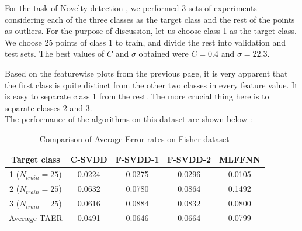 \documentclass{article} %
\begin{document}
For the task of Novelty detection , we performed 3 sets of experiments considering each of the three classes as the target class and the rest of the points as outliers. For the purpose of discussion, let us choose class 1 as the target class. We choose 25 points of class 1 to train, and divide the rest into validation and test sets. The best values of $C$ and $\sigma$ obtained were $C = 0.4$ and $\sigma = 22.3$. 

Based on the featurewise plots from the previous page, it is very apparent that the first class is quite distinct from the other
two classes in every feature value. It is easy to separate class 1 from the rest. The more crucial thing here is to separate classes 2 and 3.
\\[10pt]

The performance of the algorithms on this dataset are shown below :


\begin{table}[H]
\begin{center}
\caption{Comparison of Average Error rates on Fisher dataset}
\begin{tabular}{|c|c|c|c|c|}
\hline
Target class & C-SVDD & F-SVDD-1 & F-SVDD-2 & MLFFNN \\ \hline
1 ($N_{train} = 25$) &  0.0224  & 0.0275  & 0.0296  & 0.0105 \\ \hline
2 ($N_{train} = 25$) &  0.0632  &  0.0780  & 0.0864  & 0.1492 \\ \hline
3 ($N_{train} = 25$) & 0.0616  &  0.0884  & 0.0832 & 0.0800 \\ \hline
Average TAER &  0.0491 & 0.0646 &  0.0664 & 0.0799\\ \hline
\end{tabular}
\end{center}
\end{table}
\end{document}
